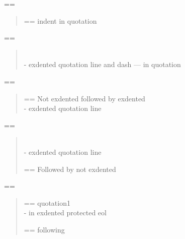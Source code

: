 \documentclass{book}
\makeatletter
\newenvironment{Texinfopreformatted}{%
  \par\GNUTobeylines\obeyspaces\frenchspacing\parskip=\z@\parindent=\z@}{}
{\catcode`\^^M=13 \gdef\GNUTobeylines{\catcode`\^^M=13 \def^^M{\null\par}}}
\newenvironment{Texinfoindented}{\begin{list}{}{}\item\relax}{\end{list}}
\renewcommand{\_}{\Texinfounderscore\discretionary{}{}{}}
\makeatother
\begin{document}
\begin{Texinfoindented}
\begin{Texinfopreformatted}
\ttfamily 
\end{Texinfopreformatted}
\begin{quote}
\begin{Texinfopreformatted}%
\ttfamily indent in quotation
\end{Texinfopreformatted}
\end{quote}
\begin{Texinfopreformatted}%
\ttfamily 
\end{Texinfopreformatted}
\begin{quote}
\leavevmode{}\\
\hbox{\kern -\leftmargin}%
exdented quotation line   and dash --- in quotation
\\
\end{quote}
\begin{Texinfopreformatted}%
\ttfamily 
\end{Texinfopreformatted}
\begin{quote}
\begin{Texinfopreformatted}%
\ttfamily Not exdented followed by exdented
\end{Texinfopreformatted}
\leavevmode{}\\
\hbox{\kern -\leftmargin}%
exdented quotation line
\\
\end{quote}
\begin{Texinfopreformatted}%
\ttfamily 
\end{Texinfopreformatted}
\begin{quote}
\leavevmode{}\\
\hbox{\kern -\leftmargin}%
exdented quotation line
\\
\begin{Texinfopreformatted}%
\ttfamily Followed by not exdented 
\end{Texinfopreformatted}
\end{quote}
\begin{Texinfopreformatted}%
\ttfamily 
\end{Texinfopreformatted}
\begin{quote}
\begin{Texinfopreformatted}%
\ttfamily quotation1
\end{Texinfopreformatted}
\leavevmode{}\\
\hbox{\kern -\leftmargin}%
in exdented protected eol \ {}
\\
\begin{Texinfopreformatted}%
\ttfamily following
\end{Texinfopreformatted}

\end{quote}
\end{Texinfoindented}
\end{document}
